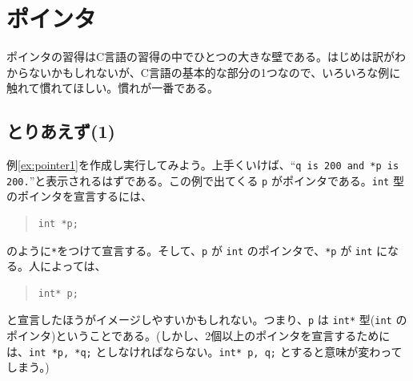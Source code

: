 \section{ポインタ}
ポインタの習得はC言語の習得の中でひとつの大きな壁である。はじめは訳がわからないかもしれないが、C言語の基本的な部分の1つなので、いろいろな例に触れて慣れてほしい。慣れが一番である。

\subsection{とりあえず(1)}
例\ref{ex:pointer1}を作成し実行してみよう。上手くいけば、``{\tt q is 200 and *p is 200.}''と表示されるはずである。この例で出てくる \verb|p| がポインタである。\verb|int| 型のポインタを宣言するには、
%
\begin{quote}
\begin{verbatim}
int *p;
\end{verbatim}
\end{quote}
%
のように\verb|*|をつけて宣言する。そして、\verb|p| が \verb|int| のポインタで、\verb|*p| が \verb|int| になる。人によっては、
%
\begin{quote}
\begin{verbatim}
int* p;
\end{verbatim}
\end{quote}
%
と宣言したほうがイメージしやすいかもしれない。つまり、\verb|p| は \verb|int*| 型(\verb|int| のポインタ)ということである。(しかし、2個以上のポインタを宣言するためには、\verb|int *p, *q;| としなければならない。\verb|int* p, q;| とすると意味が変わってしまう。)

